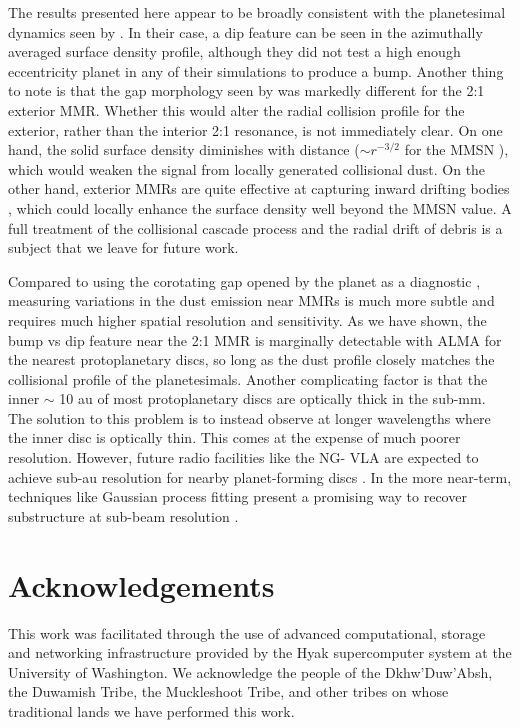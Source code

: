 \documentclass[fleqn,usenatbib]{mnras}
\begin{document}
The results presented here appear to be broadly consistent with the planetesimal dynamics seen by \citet{2016ApJ...818..159T}. In their case, a dip 
feature can be seen in the azimuthally averaged surface density profile, although they did not test a high enough eccentricity planet in any of their 
simulations to produce a bump. Another thing to note is that the gap morphology seen by \citet{2016ApJ...818..159T} was markedly different for the 
2:1 exterior MMR. Whether this would alter the radial collision profile for the exterior, rather than the interior 2:1 resonance, is not immediately clear.  
On one hand, the solid surface density diminishes with distance ($\sim r^{-3/2}$ for the MMSN \citep{1981PThPS..70...35H}), which would weaken the signal from locally 
generated collisional dust. On the other hand, exterior MMRs are quite effective at capturing inward drifting bodies \citep{1985Icar...62...16W}, which could locally enhance the 
surface density well beyond the MMSN value. A full treatment of the collisional cascade process and the radial drift of debris is a subject that we leave for future work.

Compared to using the corotating gap opened by the planet as a diagnostic \citep{2013ApJ...777L..31D, 2016ApJ...820...29D}, measuring 
variations in the dust emission near MMRs is much more subtle and requires much higher spatial resolution and sensitivity. As we have shown, the 
bump vs dip feature near the 2:1 MMR is marginally detectable with ALMA for the nearest protoplanetary discs, so long as the dust profile closely matches the collisional profile of 
the planetesimals. Another complicating factor is that 
the inner $\sim$ 10 au of most protoplanetary discs are optically thick in the sub-mm. The solution to this problem is to instead observe at longer 
wavelengths where the inner disc is optically thin. This comes at the expense of much poorer resolution. However, future radio facilities like the NG-
VLA are expected to achieve sub-au resolution for nearby planet-forming discs \citep{2018ASPC..517..147R}. In the more near-term, techniques 
like Gaussian process fitting present a promising way to recover substructure at sub-beam resolution \citep{2020arXiv200507709J}.

\section*{Acknowledgements}
This work was facilitated through the use of advanced computational, storage and networking infrastructure provided by the Hyak supercomputer system at the 
University of Washington. We acknowledge the people of the Dkhw’Duw’Absh, the Duwamish Tribe, the Muckleshoot Tribe, and other tribes on whose traditional 
lands we have performed this work.
\end{document}
